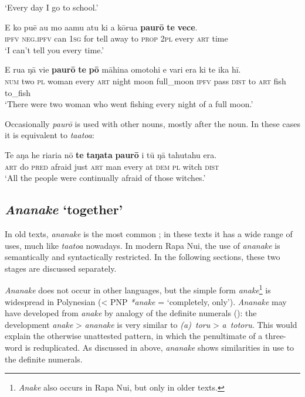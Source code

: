 \glt 
‘Every day I go to school.’ \textstyleExampleref{[R151.059]} 
\z

\ea\label{ex:4.60}
\gll E ko puē au mo {\ꞌ}a{\ꞌ}amu atu ki a kōrua \textbf{paurō} \textbf{te} \textbf{vece}. \\
\textsc{ipfv} \textsc{neg.ipfv} can \textsc{1sg} for tell away to \textsc{prop} \textsc{2pl} every \textsc{art} time \\

\glt 
‘I can’t tell you every time.’ \textstyleExampleref{[R201.009]} 
\z

\ea\label{ex:4.61}
\gll E rua ŋā vi{\ꞌ}e \textbf{paurō} \textbf{te} \textbf{pō} māhina {\ꞌ}omotohi e vari era  ki te ika hī.\\
\textsc{num} two \textsc{pl} woman every \textsc{art} night moon full\_moon \textsc{ipfv} pass \textsc{dist}  to \textsc{art} fish to\_fish\\

\glt
‘There were two woman who went fishing every night of a full moon.’ \textstyleExampleref{[R532-12.001]}
\z

Occasionally \textit{paurō} is used with other nouns, mostly after the noun. In these cases it is equivalent to \textit{ta{\ꞌ}ato{\ꞌ}a}:

\ea\label{ex:4.62}
\gll Te aŋa he ri{\ꞌ}ari{\ꞌ}a nō \textbf{te} \textbf{taŋata} \textbf{paurō} {\ꞌ}i tū ŋā tahutahu era. \\
\textsc{art} do \textsc{pred} afraid just \textsc{art} man every at \textsc{dem} \textsc{pl} witch \textsc{dist} \\

\glt 
‘All the people were continually afraid of those witches.’ \textstyleExampleref{[R233.007]} 
\z
{}
\subsection{\textit{Ananake} ‘together’}\label{sec:4.4.4}
In old texts, \textit{ananake} is the most common ; in these texts it has a wide range of uses, much like \textit{ta{\ꞌ}ato{\ꞌ}a} nowadays. In modern Rapa Nui, the use of \textit{ananake} is semantically and syntactically restricted. In the following sections, these two stages are discussed separately.

\textit{Ananake} does not occur in other languages, but the simple form \textit{anake}\footnote{\label{fn:183}\textit{Anake} also occurs in Rapa Nui, but only in older texts.} is widespread in Polynesian ({\textless} PNP \textit{*anake} = ‘completely, only’). \textit{Ananake} may have developed from \textit{anake} by analogy of the definite numerals (): the development \textit{anake} {\textgreater} \textit{ananake} is very similar to \textit{(a)~toru} {\textgreater} \textit{a~totoru}. This would explain the otherwise unattested  pattern, in which the penultimate  of a three- word is reduplicated. As discussed in  above, \textit{ananake} shows similarities in use to the definite numerals.

